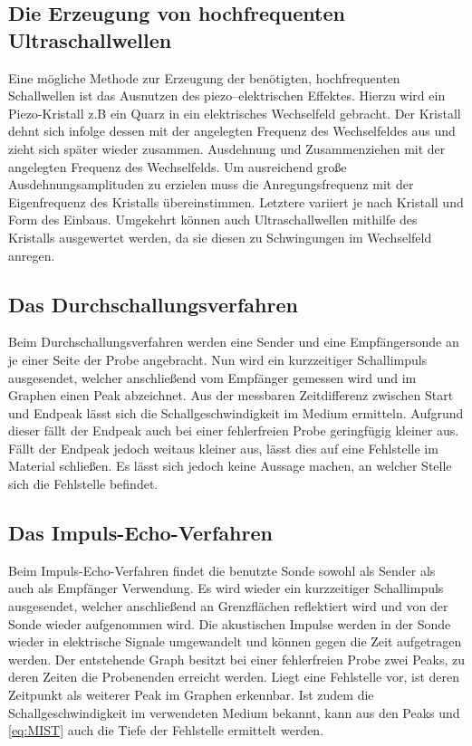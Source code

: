\subsection{Die Erzeugung von hochfrequenten Ultraschallwellen}
Eine mögliche Methode zur Erzeugung der benötigten, hochfrequenten Schallwellen
ist das Ausnutzen des piezo--elektrischen Effektes. Hierzu wird ein Piezo-Kristall z.B ein Quarz
in ein elektrisches Wechselfeld gebracht. Der Kristall dehnt sich infolge dessen
mit der angelegten Frequenz des Wechselfeldes aus und zieht sich später wieder zusammen.
Ausdehnung und Zusammenziehen mit der angelegten Frequenz des Wechselfelds. Um
ausreichend große Ausdehnungsamplituden zu erzielen muss die Anregungsfrequenz
mit der Eigenfrequenz des Kristalls übereinstimmen. Letztere variiert je nach Kristall
und Form des Einbaus. Umgekehrt können auch Ultraschallwellen mithilfe des Kristalls
ausgewertet werden, da sie diesen zu Schwingungen im Wechselfeld anregen.
\subsection{Das Durchschallungsverfahren}
Beim Durchschallungsverfahren werden eine Sender und eine Empfängersonde an je
einer Seite der Probe angebracht. Nun wird ein kurzzeitiger Schallimpuls ausgesendet, welcher
anschließend vom Empfänger gemessen wird und im Graphen einen Peak abzeichnet. Aus
der messbaren Zeitdifferenz zwischen Start und Endpeak lässt sich die Schallgeschwindigkeit im Medium ermitteln. Aufgrund dieser fällt der Endpeak auch bei einer fehlerfreien Probe geringfügig kleiner aus. Fällt der Endpeak jedoch weitaus kleiner aus, lässt dies auf eine Fehlstelle im Material schließen.
Es lässt sich jedoch keine Aussage machen, an welcher Stelle sich die Fehlstelle befindet.

\subsection{Das Impuls-Echo-Verfahren}
Beim Impuls-Echo-Verfahren findet die benutzte Sonde sowohl als Sender als auch
als Empfänger Verwendung. Es wird wieder ein kurzzeitiger Schallimpuls ausgesendet,
welcher anschließend an Grenzflächen reflektiert wird und von der Sonde wieder aufgenommen wird.
Die akustischen Impulse werden in der Sonde wieder in elektrische Signale umgewandelt
und können gegen die Zeit aufgetragen werden. Der entstehende Graph besitzt bei einer
fehlerfreien Probe zwei Peaks, zu deren Zeiten die Probenenden erreicht werden.
Liegt eine Fehlstelle vor, ist deren Zeitpunkt als weiterer Peak im Graphen erkennbar. Ist
zudem die Schallgeschwindigkeit im verwendeten Medium bekannt, kann aus den Peaks
und \ref{eq:MIST} auch die Tiefe der Fehlstelle ermittelt werden.

